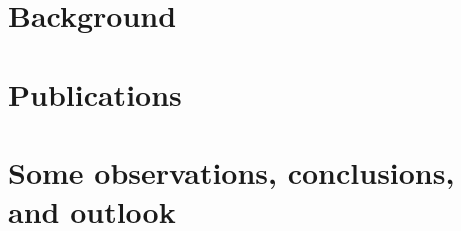 \documentclass[final]{src/thesis} %
\author{Ralf Johannes Josephus Mackenbach}
\begin{document}
 
\thispagestyle{empty}








\cleardoublepage
{}
\tableofcontents

\newpage


\isstarredchapterfalse
\cleardoublepage
\thispagestyle{empty}
\setcounter{page}{1}
\part{Background}\label{part: background}



\cleardoublepage
\part{Publications}\label{part: publications}






\cleardoublepage
\part{Some observations, conclusions, and outlook}\label{part: closing}


\end{document}
